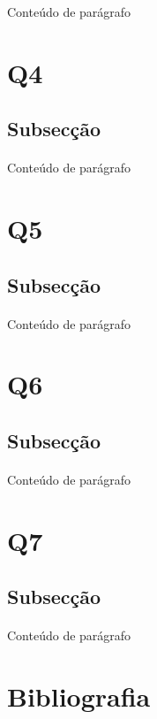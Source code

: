 \documentclass[12pt]{article}
\begin{document}
Conteúdo de parágrafo
\section{Q4}
\subsection{Subsecção}
\paragraph{}

Conteúdo de parágrafo
\section{Q5}
\subsection{Subsecção}
\paragraph{}

Conteúdo de parágrafo
\section{Q6}
\subsection{Subsecção}
\paragraph{}

Conteúdo de parágrafo
\section{Q7}
\subsection{Subsecção}
\paragraph{}

Conteúdo de parágrafo

\newpage
\section{Bibliografia}


\end{document}
